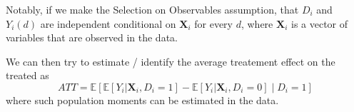 \documentclass[
]{article}
\begin{document}
\begin{enumerate}
\begin{enumerate}
    \par\medskip

    Notably, if we make the Selection on Observables assumption, that
    \(D_i\) and \(Y_i(d)\) are independent conditional on
    \(\boldsymbol{X}_i\) for every \(d\), where \(\boldsymbol{X}_i\) is
    a vector of variables that are observed in the data.

    We can then try to estimate / identify the average treatement effect
    on the treated as \newline
    \[ATT = \mathbb{E}[\mathbb{E}[Y_{i} |\boldsymbol{X}_i, D_i = 1] - \mathbb{E}[Y_{i} |\boldsymbol{X}_i, D_i = 0] \mid D_i = 1]\]
    \newline where such population moments can be estimated in the data.
  \end{enumerate}
\end{enumerate}

\pagebreak
\end{document}
